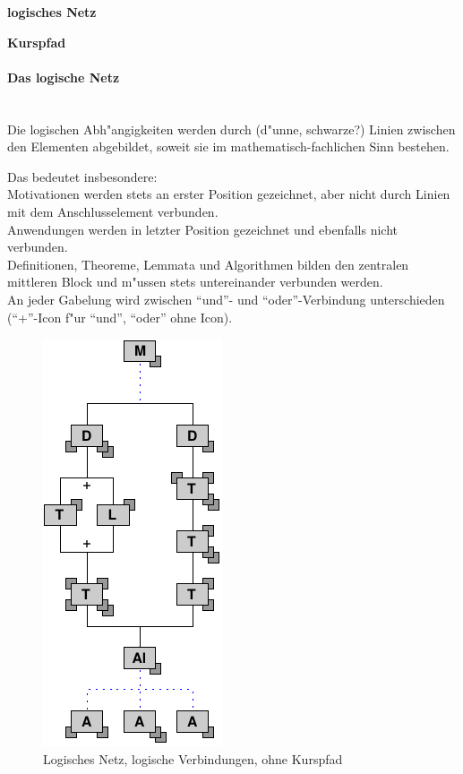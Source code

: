 \begin{list_sabina}
        \item \textbf{logisches Netz}
        \item \textbf{Kurspfad} 
\end{list_sabina}


\paragraph{Das logische Netz}\mbox{ }\\[-2ex]

Die logischen Abh"angigkeiten werden durch (d"unne, schwarze?) Linien
zwischen den Elementen abgebildet, soweit sie im
mathematisch-fachlichen Sinn bestehen.

Das bedeutet insbesondere: \\
Motivationen werden stets an erster Position gezeichnet, aber nicht
durch Linien mit dem Anschlusselement verbunden.\\
Anwendungen werden in letzter Position gezeichnet und ebenfalls nicht
verbunden.\\
Definitionen, Theoreme, Lemmata und Algorithmen bilden den zentralen
mittleren Block und m"ussen stets untereinander verbunden werden. \\
An jeder Gabelung wird zwischen ``und''- und ``oder''-Verbindung
unterschieden (``+''-Icon f"ur ``und'', ``oder'' ohne Icon).

\begin{figure}[h]
\begin{center}
\ifx\pdfoutput\undefined
\else
  \includegraphics{Skizzen/navi_drittel.pdf}
\fi
\caption{Logisches Netz, logische Verbindungen, ohne Kurspfad}
\end{center}
\end{figure}

